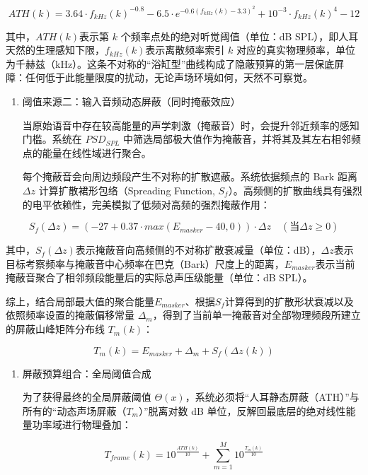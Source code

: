 \[ATH(k) = 3.64 \cdot f_{kHz}(k)^{- 0.8} - 6.5 \cdot e^{- 0.6(f_{kHz}(k) - 3.3)^{2}} + 10^{- 3} \cdot f_{kHz}(k)^{4} - 12\]

其中，\(ATH(k)\)表示第 \(k\) 个频率点处的绝对听觉阈值（单位：dB
SPL），即人耳天然的生理感知下限，\(f_{kHz}(k)\)表示离散频率索引 \(k\)
对应的真实物理频率，单位为千赫兹（kHz）。这条不对称的``浴缸型''曲线构成了隐蔽预算的第一层保底屏障：任何低于此能量限度的扰动，无论声场环境如何，天然不可察觉。

\begin{enumerate}
\def\labelenumi{(\arabic{enumi})}
\setcounter{enumi}{2}
\item
  阈值来源二：输入音频动态屏蔽（同时掩蔽效应）

  当原始语音中存在较高能量的声学刺激（掩蔽音）时，会提升邻近频率的感知门槛。系统在
  \(PSD_{SPL}\)
  中筛选局部极大值作为掩蔽音，并将其及其左右相邻频点的能量在线性域进行聚合。

  每个掩蔽音会向周边频段产生不对称的扩散遮蔽。系统依据频点的 Bark 距离
  \(\Delta z\) 计算扩散裙形包络（Spreading Function,
  \(S_{f}\)）。高频侧的扩散曲线具有强烈的电平依赖性，完美模拟了低频对高频的强烈掩蔽作用：
\end{enumerate}

\[S_{f}(\Delta z) = \left( - 27 + 0.37 \cdot max(E_{masker} - 40,0) \right) \cdot \Delta z\quad(\text{当}\Delta z \geq 0)\]

其中，\(S_{f}(\Delta z)\)表示掩蔽音向高频侧的不对称扩散衰减量（单位：dB），\(\Delta z\)表示目标考察频率与掩蔽音中心频率在巴克（Bark）尺度上的距离，\(E_{masker}\)表示当前掩蔽音聚合了相邻频段能量后的实际总声压级能量（单位：dB
SPL）。

综上，结合局部最大值的聚合能量\(E_{masker}\)、根据\(S_{f}\)计算得到的扩散形状衰减以及依照频率设置的掩蔽偏移常量
\(\Delta_{m}\)，得到了当前单一掩蔽音对全部物理频段所建立的屏蔽山峰矩阵分布线
\(T_m(k)\)：

\[T_m(k)=E_{masker}+\Delta_m+S_f(\Delta z(k))\]

\begin{enumerate}
\def\labelenumi{(\arabic{enumi})}
\setcounter{enumi}{3}
\item
  屏蔽预算组合：全局阈值合成

  为了获得最终的全局屏蔽阈值
  \(\Theta(x)\)，系统必须将``人耳静态屏蔽（ATH）''与所有的``动态声场屏蔽（\(T_{m}\)）''脱离对数
  dB 单位，反解回最底层的绝对线性能量功率域进行物理叠加：
\end{enumerate}

\[T_{frame}(k) = 10^{\frac{ATH(k)}{10}} + \sum_{m = 1}^{M}10^{\frac{T_{m}(k)}{10}}\]

